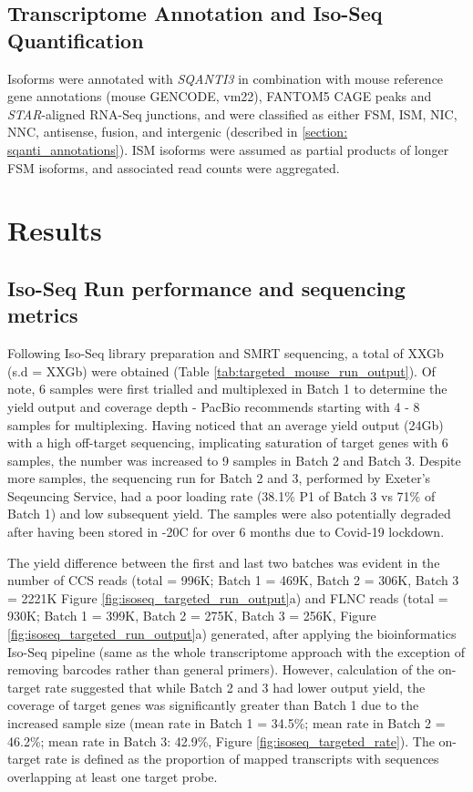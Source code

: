 \subsection{Transcriptome Annotation and Iso-Seq Quantification}
Isoforms were annotated with \textit{SQANTI3} in combination with mouse reference gene annotations (mouse GENCODE, vm22), FANTOM5 CAGE peaks and \textit{STAR}-aligned RNA-Seq junctions, and were classified as either FSM, ISM, NIC, NNC, antisense, fusion, and intergenic (described in \cref{section: sqanti_annotations}). ISM isoforms were assumed as partial products of longer FSM isoforms, and associated read counts were aggregated.   

\newpage
\section{Results}
\subsection{Iso-Seq Run performance and sequencing metrics}
Following Iso-Seq library preparation and SMRT sequencing, a total of XXGb (s.d = XXGb) were obtained (Table \ref{tab:targeted_mouse_run_output}). Of note, 6 samples were first trialled and multiplexed in Batch 1 to determine the yield output and coverage depth - PacBio recommends starting with 4 - 8 samples for multiplexing. Having noticed that an average yield output (24Gb) with a high off-target sequencing, implicating saturation of target genes with 6 samples, the number was increased to 9 samples in Batch 2 and Batch 3. Despite more samples, the sequencing run for Batch 2 and 3, performed by Exeter's Seqeuncing Service, had a poor loading rate (38.1\% P1 of Batch 3 vs 71\% of Batch 1) and low subsequent yield. The samples were also potentially degraded after having been stored in -20\textdegree C for over 6 months due to Covid-19 lockdown. 

The yield difference between the first and last two batches was evident in the number of CCS reads (total = 996K; Batch 1 = 469K, Batch 2 = 306K, Batch 3 = 2221K Figure \ref{fig:isoseq_targeted_run_output}a) and FLNC reads (total = 930K; Batch 1 = 399K, Batch 2 = 275K, Batch 3 = 256K, Figure \ref{fig:isoseq_targeted_run_output}a) generated, after applying the bioinformatics Iso-Seq pipeline (same as the whole transcriptome approach with the exception of removing barcodes rather than general primers). However, calculation of the on-target rate suggested that while Batch 2 and 3 had lower output yield, the coverage of target genes was significantly greater than Batch 1 due to the increased sample size (mean rate in Batch 1 = 34.5\%; mean rate in Batch 2 = 46.2\%; mean rate in Batch 3: 42.9\%, Figure \ref{fig:isoseq_targeted_rate}). The on-target rate is defined as the proportion of mapped transcripts with sequences overlapping at least one target probe. 

